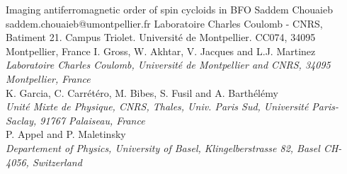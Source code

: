 \begin{conf-abstract}[]
{Imaging antiferromagnetic order of spin cycloids in BFO}
{\color{blue} Saddem Chouaieb}
{saddem.chouaieb@umontpellier.fr}
{Laboratoire Charles Coulomb - CNRS, Batiment 21. Campus Triolet. Université de Montpellier. CC074, 34095 Montpellier, France}
{{\color{blue}I. Gross, W. Akhtar, V. Jacques and L.J. Martinez}\\ \textit{Laboratoire Charles Coulomb, Université de Montpellier and CNRS, 34095 Montpellier, France}\\ 
{\color{blue}K. Garcia, C. Carrétéro, M. Bibes, S. Fusil and A. Barthélémy}\\ \textit{ Unité Mixte de Physique, CNRS, Thales, Univ. Paris Sud, Université Paris-Saclay, 91767 Palaiseau, France}\\ 
{\color{blue}P. Appel and P. Maletinsky}\\ \textit{Departement of Physics, University of Basel, Klingelberstrasse 82, Basel CH-4056, Switzerland}\\ 
\decofourleft \decofourright}





\printbibliography[heading=none]

\end{conf-abstract}
